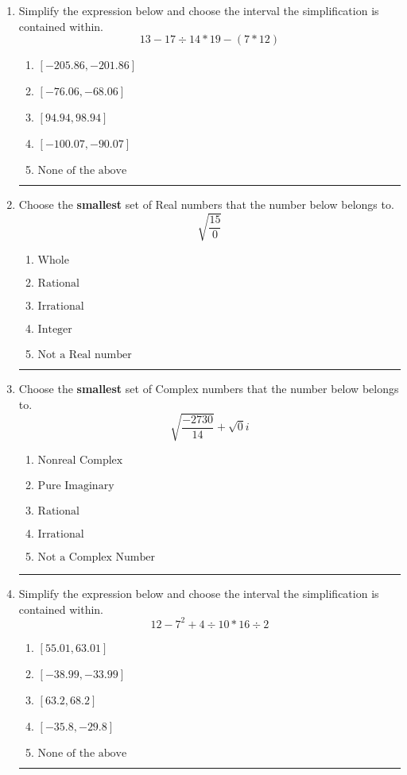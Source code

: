 \documentclass[14pt]{extbook}
\newcommand{\litem}[1]{\item#1\hspace*{-1cm}\rule{\textwidth}{0.4pt}}
\begin{document}
\begin{enumerate}
{\begin{enumerate}[label=\Alph*.]
\end{enumerate} }
\litem{
Simplify the expression below and choose the interval the simplification is contained within.\[ 13 - 17 \div 14 * 19 - (7 * 12) \]\begin{enumerate}[label=\Alph*.]
\item \( [-205.86, -201.86] \)
\item \( [-76.06, -68.06] \)
\item \( [94.94, 98.94] \)
\item \( [-100.07, -90.07] \)
\item \( \text{None of the above} \)

\end{enumerate} }
\litem{
Choose the \textbf{smallest} set of Real numbers that the number below belongs to.\[ \sqrt{\frac{15}{0}} \]\begin{enumerate}[label=\Alph*.]
\item \( \text{Whole} \)
\item \( \text{Rational} \)
\item \( \text{Irrational} \)
\item \( \text{Integer} \)
\item \( \text{Not a Real number} \)

\end{enumerate} }
\litem{
Choose the \textbf{smallest} set of Complex numbers that the number below belongs to.\[ \sqrt{\frac{-2730}{14}}+\sqrt{0}i \]\begin{enumerate}[label=\Alph*.]
\item \( \text{Nonreal Complex} \)
\item \( \text{Pure Imaginary} \)
\item \( \text{Rational} \)
\item \( \text{Irrational} \)
\item \( \text{Not a Complex Number} \)

\end{enumerate} }
\litem{
Simplify the expression below and choose the interval the simplification is contained within.\[ 12 - 7^2 + 4 \div 10 * 16 \div 2 \]\begin{enumerate}[label=\Alph*.]
\item \( [55.01, 63.01] \)
\item \( [-38.99, -33.99] \)
\item \( [63.2, 68.2] \)
\item \( [-35.8, -29.8] \)
\item \( \text{None of the above} \)


\end{enumerate}}
\end{enumerate}
\end{document}
